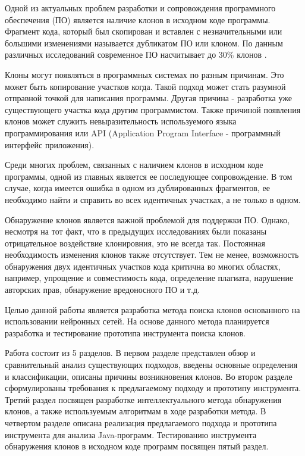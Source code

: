\intro
Одной из актуальных проблем разработки и сопровождения программного обеспечения (ПО) является наличие клонов в исходном коде программы. Фрагмент кода, который был скопирован и вставлен с незначительными или большими изменениями называется дубликатом ПО или клоном. По данным различных исследований современное ПО насчитывает до 30\% клонов \cite{royandcordy}.

Клоны могут появляться в программных системах по разным причинам. Это может быть копирование участков когда. Такой подход может стать разумной отправной точкой для написания программы. Другая причина - разработка уже существующего участка кода другим программистом. Также причиной появления клонов может служить невыразительность используемого языка программирования или API (Application Program Interface - программный интерфейс приложения).


Среди многих проблем, связанных с наличием клонов в исходном коде программы, одной из главных является ее последующее сопровождение. В том случае, когда имеется ошибка в одном из дублированных фрагментов, ее необходимо найти и справить во всех идентичных участках, а не только в одном.

Обнаружение клонов является важной проблемой для поддержки ПО. Однако, несмотря на тот факт, что в предыдущих исследованиях были показаны отрицательное воздействие клонировния, это не всегда так. Постоянная необходимость изменения клонов также отсутствует. Тем не менее, возможность обнаружения двух идентичных участков кода критична во многих областях, например, упрощение и совместимость кода, определение плагиата, нарушение авторских прав, обнаружение вредоносного ПО и т.д.

Целью данной работы является разработка метода поиска клонов основанного на использовании нейронных сетей. На основе данного метода планируется разработка и тестирование прототипа инструмента поиска клонов.

Работа состоит из 5 разделов. В первом разделе представлен обзор и сравнительный анализ существующих подходов, введены основные определения и классификации, описаны причины возникновения клонов. Во втором разделе сформулированы требования к предлагаемому подходу и прототипу инструмента. Третий раздел посвящен разработке интеллектуального метода обнаружения клонов, а также используемым алгоритмам в ходе разработки метода. В четвертом разделе описана реализация предлагаемого подхода и прототипа инструмента для анализа Java-программ. Тестированию инструмента обнаружения клонов в исходном коде программ посвящен пятый раздел.
